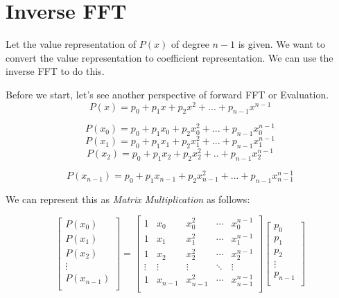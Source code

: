\documentclass{report}
\begin{document}
\tableofcontents

\newpage
\chapter{Inverse FFT}
Let the value representation of $P(x)$ of degree $n-1$  is given. We want to convert the value representation to coefficient representation. We can use the inverse FFT to do this. \newline

Before we start, let's see another perspective of forward FFT or Evaluation.
$$P(x) = p_0 + p_1x + p_2x^2 + ... + p_{n-1}x^{n-1}$$

$$ P(x_0) = p_0 + p_1x_0 + p_2x_0^2 + ... + p_{n-1}x_0^{n-1}$$
$$ P(x_1) = p_0 + p_1x_1 + p_2x_1^2 +... + p_{n-1}x_1^{n-1} $$
$$ P(x_2) = p_0 + p_1x_2 + p_2x_2^2 + .. + p_{n-1}x_2^{n-1} $$

$$ P(x_{n-1}) = p_0 + p_1x_{n-1} + p_2x_{n-1}^2 + ... + p_{n-1}x_{n-1}^{n-1} $$

We can represent this as \textit{Matrix Multiplication} as follows:

\begin{equation*}
	\begin{bmatrix}
					P(x_0) \\
				 P(x_1)\\
					P(x_2)\\
					\vdots \\
					P(x_{n-1}) \\
			\end{bmatrix}
			=
			\begin{bmatrix}
					1 & x_0 & x_0^2 & \cdots & x_0^{n-1} \\
					1 & x_1 & x_1^2 & \cdots & x_1^{n-1} \\
					1 & x_2 & x_2^2 & \cdots & x_2^{n-1} \\
					\vdots & \vdots & \vdots & \ddots & \vdots \\
					1 & x_{n-1} & x_{n-1}^2 & \cdots & x_{n-1}^{n-1} \\
			\end{bmatrix}
			\begin{bmatrix}
					p_0 \\
					p_1 \\
					p_2 \\
					\vdots \\
					p_{n-1} \\
			\end{bmatrix}
	\end{equation*}
\newline
\end{document}
